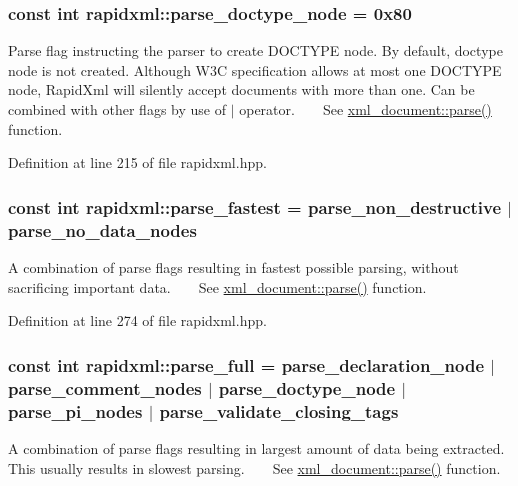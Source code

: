 \subsubsection[{\texorpdfstring{parse\+\_\+doctype\+\_\+node}{parse_doctype_node}}]{\setlength{\rightskip}{0pt plus 5cm}const int rapidxml\+::parse\+\_\+doctype\+\_\+node = 0x80}\hypertarget{namespacerapidxml_a41002b49780a90a0bbcc28ce8b895fe4}{}\label{namespacerapidxml_a41002b49780a90a0bbcc28ce8b895fe4}
Parse flag instructing the parser to create D\+O\+C\+T\+Y\+PE node. By default, doctype node is not created. Although W3C specification allows at most one D\+O\+C\+T\+Y\+PE node, Rapid\+Xml will silently accept documents with more than one. Can be combined with other flags by use of $\vert$ operator. ~\newline
~\newline
 See \hyperlink{classrapidxml_1_1xml__document_ac6e73ff9ac323bf5a370c38feb03a6b1}{xml\+\_\+document\+::parse()} function. 

Definition at line 215 of file rapidxml.\+hpp.

\subsubsection[{\texorpdfstring{parse\+\_\+fastest}{parse_fastest}}]{\setlength{\rightskip}{0pt plus 5cm}const int rapidxml\+::parse\+\_\+fastest = {\bf parse\+\_\+non\+\_\+destructive} $\vert$ {\bf parse\+\_\+no\+\_\+data\+\_\+nodes}}\hypertarget{namespacerapidxml_a64da06dfdab7c86ca954bda4fecb978f}{}\label{namespacerapidxml_a64da06dfdab7c86ca954bda4fecb978f}
A combination of parse flags resulting in fastest possible parsing, without sacrificing important data. ~\newline
~\newline
 See \hyperlink{classrapidxml_1_1xml__document_ac6e73ff9ac323bf5a370c38feb03a6b1}{xml\+\_\+document\+::parse()} function. 

Definition at line 274 of file rapidxml.\+hpp.

\subsubsection[{\texorpdfstring{parse\+\_\+full}{parse_full}}]{\setlength{\rightskip}{0pt plus 5cm}const int rapidxml\+::parse\+\_\+full = {\bf parse\+\_\+declaration\+\_\+node} $\vert$ {\bf parse\+\_\+comment\+\_\+nodes} $\vert$ {\bf parse\+\_\+doctype\+\_\+node} $\vert$ {\bf parse\+\_\+pi\+\_\+nodes} $\vert$ {\bf parse\+\_\+validate\+\_\+closing\+\_\+tags}}\hypertarget{namespacerapidxml_abb48dc65db75d9e49734bc5bd2fabbfc}{}\label{namespacerapidxml_abb48dc65db75d9e49734bc5bd2fabbfc}
A combination of parse flags resulting in largest amount of data being extracted. This usually results in slowest parsing. ~\newline
~\newline
 See \hyperlink{classrapidxml_1_1xml__document_ac6e73ff9ac323bf5a370c38feb03a6b1}{xml\+\_\+document\+::parse()} function. 

